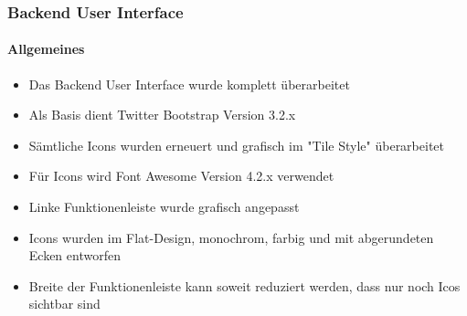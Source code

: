 %

\begin{frame}[fragile]
	\frametitle{Backend User Interface}
	\framesubtitle{Allgemeines}

	\begin{itemize}
		\item Das Backend User Interface wurde komplett überarbeitet
		\item Als Basis dient Twitter Bootstrap Version 3.2.x
		\item Sämtliche Icons wurden erneuert und grafisch im "Tile Style" überarbeitet
		\item Für Icons wird Font Awesome Version 4.2.x verwendet
		\item Linke Funktionenleiste wurde grafisch angepasst
		\item Icons wurden im Flat-Design, monochrom, farbig und mit abgerundeten Ecken entworfen
		\item Breite der Funktionenleiste kann soweit reduziert werden, dass nur noch Icos sichtbar sind
	\end{itemize}

\end{frame}



